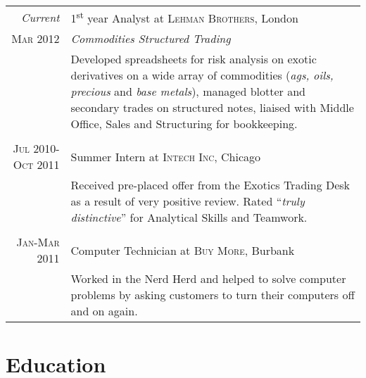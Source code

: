 \documentclass[a4paper,10pt]{article} %
\begin{document}
\begin{tabular}{r|p{11cm}}
\emph{Current} & 1\textsuperscript{st} year Analyst at \textsc{Lehman Brothers}, London \\
\textsc{Mar 2012} & \emph{Commodities Structured Trading}\\
& \footnotesize{Developed spreadsheets for risk analysis on exotic derivatives on a wide array of commodities (\textit{ags, oils, precious} and \textit{base metals}), managed blotter and secondary trades on structured notes, liaised with Middle Office, Sales and Structuring for bookkeeping.}\\
\multicolumn{2}{c}{} \\


\textsc{Jul 2010-Oct 2011} & Summer Intern at \textsc{Intech Inc}, Chicago \emph{}\\
& \footnotesize{Received pre-placed offer from the Exotics Trading Desk as a result of very positive review. Rated ``\emph{truly distinctive}'' for Analytical Skills and Teamwork.}\\
\multicolumn{2}{c}{} \\


\textsc{Jan-Mar 2011} & Computer Technician at \textsc{Buy More}, Burbank \emph{}\\
& \footnotesize{Worked in the Nerd Herd and helped to solve computer problems by asking customers to turn their computers off and on again.}
\end{tabular}


\section{Education}
\end{document}
